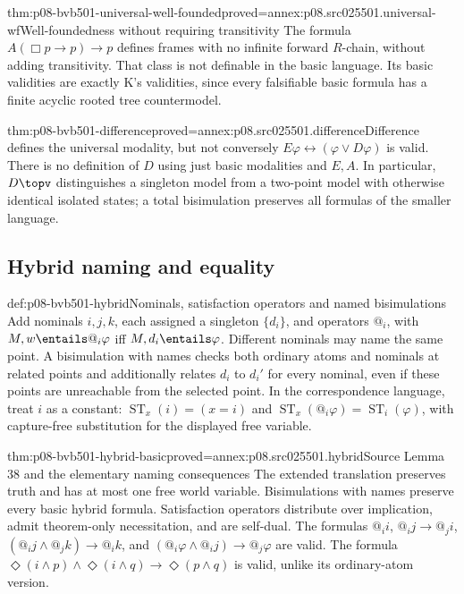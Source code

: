 \begin{hbtheorem}{thm:p08-bvb501-universal-well-founded}{proved=annex:p08.src025501.universal-wf}{Well-foundedness without requiring transitivity}
The formula \(A(\Box p\to p)\to p\) defines frames with no
infinite forward \(R\)-chain, without adding transitivity. That class
is not definable in the basic language. Its basic validities are exactly
K's validities, since every falsifiable basic formula has a finite
acyclic rooted tree countermodel.
\end{hbtheorem}

\begin{hbtheorem}{thm:p08-bvb501-difference}{proved=annex:p08.src025501.difference}{Difference defines the universal modality, but not conversely}
\(E\varphi\leftrightarrow(\varphi\lor D\varphi)\) is
valid. There is no definition of \(D\) using just basic modalities
and \(E,A\). In particular, \(D\topv\) distinguishes a
singleton model from a two-point model with otherwise identical isolated
states; a total bisimulation preserves all formulas of the smaller language.
\end{hbtheorem}

\subsection{Hybrid naming and equality}
\label{sec:p08-bvb501-hybrid}

\begin{hbdefinition}{def:p08-bvb501-hybrid}{Nominals, satisfaction operators and named bisimulations}
Add nominals \(i,j,k\), each assigned a singleton \(\{d_i\}\),
and operators \(@_i\), with \(M,w\entails @_i\varphi\) iff
\(M,d_i\entails\varphi\). Different nominals may name the same
point. A bisimulation with names checks both ordinary atoms and nominals
at related points and additionally relates \(d_i\) to \(d_i'\)
for every nominal, even if these points are unreachable from the selected
point. In the correspondence language, treat \(i\) as a constant:
\(\operatorname{ST}_x(i)=(x=i)\) and
\(\operatorname{ST}_x(@_i\varphi)=\operatorname{ST}_i(\varphi)\),
with capture-free substitution for the displayed free variable.
\end{hbdefinition}

\begin{hbtheorem}{thm:p08-bvb501-hybrid-basic}{proved=annex:p08.src025501.hybrid}{Source Lemma 38 and the elementary naming consequences}
The extended translation preserves truth and has at most one free world
variable. Bisimulations with names preserve every basic hybrid formula.
Satisfaction operators distribute over implication, admit theorem-only
necessitation, and are self-dual. The formulas \(@_i i\),
\(@_i j\to @_j i\), \((@_i j\land @_j k)\to @_i k\),
and \((@_i\varphi\land @_i j)\to @_j\varphi\) are valid.
The formula \(\Diamond(i\land p)\land\Diamond(i\land q)
\to\Diamond(p\land q)\) is valid, unlike its ordinary-atom version.
\end{hbtheorem}

